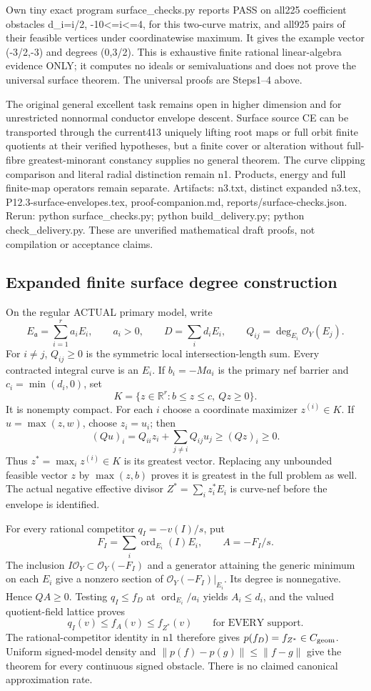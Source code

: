 Own tiny exact program surface\_checks.py reports PASS on all225 coefficient obstacles d\_i=i/2, -10<=i<=4, for this two-curve matrix, and all925 pairs of their feasible vertices under coordinatewise maximum. It gives the example vector (-3/2,-3) and degrees (0,3/2). This is exhaustive finite rational linear-algebra evidence ONLY; it computes no ideals or semivaluations and does not prove the universal surface theorem. The universal proofs are Steps1--4 above.

The original general excellent task remains open in higher dimension and for unrestricted nonnormal conductor envelope descent. Surface source CE can be transported through the current413 uniquely lifting root maps or full orbit finite quotients at their verified hypotheses, but a finite cover or alteration without full-fibre greatest-minorant constancy supplies no general theorem. The curve clipping comparison and literal radial distinction remain n1. Products, energy and full finite-map operators remain separate. Artifacts: n3.txt, distinct expanded n3.tex, P12.3-surface-envelopes.tex, proof-companion.md, reports/surface-checks.json. Rerun: python surface\_checks.py; python build\_delivery.py; python check\_delivery.py. These are unverified mathematical draft proofs, not compilation or acceptance claims.

\subsection*{Expanded finite surface degree construction}
On the regular ACTUAL primary model, write
\[
 E_{\mathfrak a}=\sum_{i=1}^r a_i E_i,\qquad a_i>0,
 \qquad D=\sum_i d_i E_i,\qquad
 Q_{ij}=\deg_{E_i}\mathcal O_Y(E_j).
\]
For $i\ne j$, $Q_{ij}\ge0$ is the symmetric local intersection-length
sum. Every contracted integral curve is an $E_i$. If
$b_i=-Ma_i$ is the primary nef barrier and $c_i=\min(d_i,0)$, set
\[
 K=\{z\in\mathbb R^r:b\le z\le c,\ Qz\ge0\}.
\]
It is nonempty compact. For each $i$ choose a coordinate maximizer
$z^{(i)}\in K$. If $u=\max(z,w)$, choose $z_i=u_i$; then
\[
 (Qu)_i=Q_{ii}z_i+\sum_{j\ne i}Q_{ij}u_j
 \ge (Qz)_i\ge0.
\]
Thus $z^*=\max_i z^{(i)}\in K$ is its greatest vector. Replacing any
unbounded feasible vector $z$ by $\max(z,b)$ proves it is greatest
in the full problem as well. The actual negative effective divisor
$Z^*=\sum_i z_i^*E_i$ is curve-nef before the envelope is identified.

For every rational competitor $q_I=-v(I)/s$, put
\[
 F_I=\sum_i\operatorname{ord}_{E_i}(I)E_i,\qquad A=-F_I/s.
\]
The inclusion $I\mathcal O_Y\subset\mathcal O_Y(-F_I)$ and a generator
attaining the generic minimum on each $E_i$ give a nonzero section of
$\mathcal O_Y(-F_I)|_{E_i}$. Its degree is nonnegative. Hence $QA\ge0$.
Testing $q_I\le f_D$ at $\operatorname{ord}_{E_i}/a_i$ yields
$A_i\le d_i$, and the valued quotient-field lattice proves
\[
 q_I(v)\le f_A(v)\le f_{Z^*}(v)\qquad\text{for EVERY support}.
\]
The rational-competitor identity in n1 therefore gives
$p(f_D)=f_{Z^*}\in C_{\rm geom}$. Uniform signed-model density and
$\|p(f)-p(g)\|\le\|f-g\|$ give the theorem for every continuous signed
obstacle. There is no claimed canonical approximation rate.

